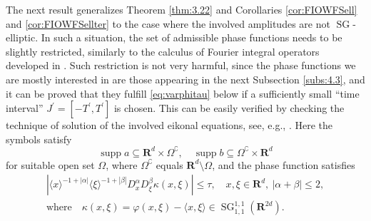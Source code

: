 \documentclass[12pt,a4paper,reqno]{amsart}
\numberwithin{equation}{section}
\numberwithin{thm}{section}
\theoremstyle{definition}
\theoremstyle{remark}
\begin{document}
\par

The next result generalizes Theorem \ref{thm:3.22} and Corollaries
\ref{cor:FIOWFSell} and \ref{cor:FIOWFSellter} to the case where
the involved amplitudes are not ${\operatorname{SG}}$-elliptic. In such a situation,
the set of admissible phase functions needs to be slightly restricted,
similarly to the calculus of Fourier integral operators developed in
\cite{Ku}. Such restriction is not very harmful, since the phase
functions we are mostly interested in are those appearing in the
next Subsection \ref{subs:4.3}, and it can be proved that they fulfill
\eqref{eq:varphitau} below if a sufficiently small ``time interval''
$J^\prime=[-T^\prime,T^\prime]$ is chosen. This can be easily
verified by checking the technique of solution of the involved
eikonal equations, see, e.g., \cite{Ku, coriasco2, CoPa, CoRo}.
Here the symbols satisfy
\begin{equation}\label{eq:abSupport}
{\operatorname{supp}} a\subseteq {\mathbf R^{d}}\times \Omega ^\complement ,
\quad
{\operatorname{supp}} b\subseteq \Omega ^\complement \times {\mathbf R^{d}}
\end{equation}
for suitable open set $\Omega $, where $\Omega ^\complement$ 
equals ${\mathbf R^{d}}\setminus \Omega$, and the phase function satisfies
\begin{equation}\label{eq:varphitau}
\begin{gathered}
	|{\langle{x}\rangle}^{-1+|\alpha|}{\langle{\xi}\rangle}^{-1+|\beta|}D^\alpha_xD^\beta_\xi
	\kappa (x,\xi)|\le\tau,\quad
	x,\xi \in {\mathbf R^{d}},\ |\alpha+\beta|\le2,
\\
\text{where}\quad
\kappa (x,\xi)=\varphi(x,\xi)-\langle x,\xi\rangle\in{\operatorname{SG}}^{1,1}_{1,1}({\mathbf R^{{2d}}}).
\end{gathered}
\end{equation}

\par
\end{document}
